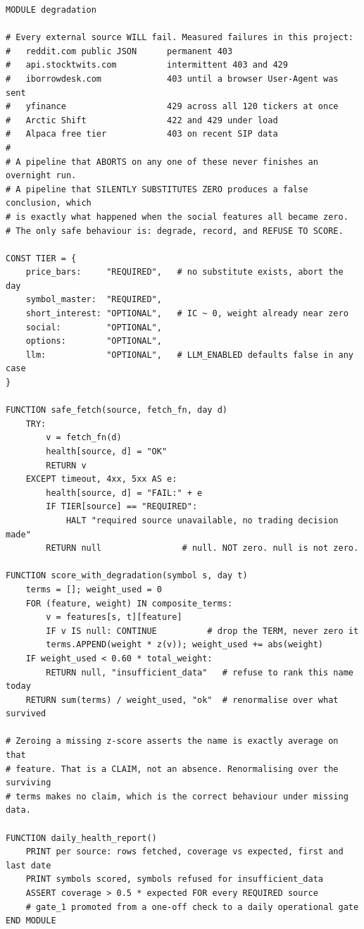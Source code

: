 \documentclass[10pt]{article}
\begin{document}
\begin{lstlisting}
MODULE degradation

# Every external source WILL fail. Measured failures in this project:
#   reddit.com public JSON      permanent 403
#   api.stocktwits.com          intermittent 403 and 429
#   iborrowdesk.com             403 until a browser User-Agent was sent
#   yfinance                    429 across all 120 tickers at once
#   Arctic Shift                422 and 429 under load
#   Alpaca free tier            403 on recent SIP data
#
# A pipeline that ABORTS on any one of these never finishes an overnight run.
# A pipeline that SILENTLY SUBSTITUTES ZERO produces a false conclusion, which
# is exactly what happened when the social features all became zero.
# The only safe behaviour is: degrade, record, and REFUSE TO SCORE.

CONST TIER = {
    price_bars:     "REQUIRED",   # no substitute exists, abort the day
    symbol_master:  "REQUIRED",
    short_interest: "OPTIONAL",   # IC ~ 0, weight already near zero
    social:         "OPTIONAL",
    options:        "OPTIONAL",
    llm:            "OPTIONAL",   # LLM_ENABLED defaults false in any case
}

FUNCTION safe_fetch(source, fetch_fn, day d)
    TRY:
        v = fetch_fn(d)
        health[source, d] = "OK"
        RETURN v
    EXCEPT timeout, 4xx, 5xx AS e:
        health[source, d] = "FAIL:" + e
        IF TIER[source] == "REQUIRED":
            HALT "required source unavailable, no trading decision made"
        RETURN null                # null. NOT zero. null is not zero.

FUNCTION score_with_degradation(symbol s, day t)
    terms = []; weight_used = 0
    FOR (feature, weight) IN composite_terms:
        v = features[s, t][feature]
        IF v IS null: CONTINUE          # drop the TERM, never zero it
        terms.APPEND(weight * z(v)); weight_used += abs(weight)
    IF weight_used < 0.60 * total_weight:
        RETURN null, "insufficient_data"   # refuse to rank this name today
    RETURN sum(terms) / weight_used, "ok"  # renormalise over what survived

# Zeroing a missing z-score asserts the name is exactly average on that
# feature. That is a CLAIM, not an absence. Renormalising over the surviving
# terms makes no claim, which is the correct behaviour under missing data.

FUNCTION daily_health_report()
    PRINT per source: rows fetched, coverage vs expected, first and last date
    PRINT symbols scored, symbols refused for insufficient_data
    ASSERT coverage > 0.5 * expected FOR every REQUIRED source
    # gate_1 promoted from a one-off check to a daily operational gate
END MODULE
\end{lstlisting}
\end{document}

